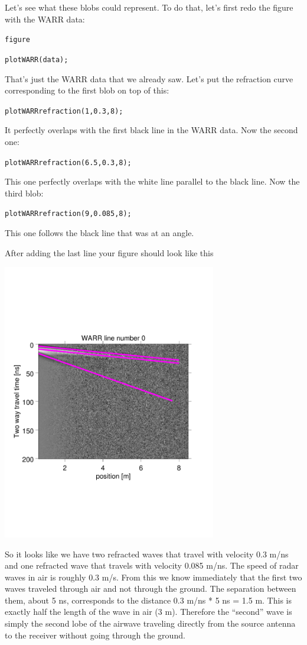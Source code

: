 \documentclass[11pt]{article}
\begin{document}
Let's see what these blobs could represent. To do that, let's first
redo the figure with the WARR data:

\qquad \verb#figure#

\qquad \verb#plotWARR(data);#

That's just the WARR data that we already saw. Let's put the
refraction curve corresponding to the first blob on top of this:
 
\qquad \verb#plotWARRrefraction(1,0.3,8);#

It perfectly overlaps with the first black line in the WARR
data. Now the second one:

\qquad \verb#plotWARRrefraction(6.5,0.3,8);#

This one perfectly overlaps with the white line parallel to the black
line. Now the third blob:

\qquad \verb#plotWARRrefraction(9,0.085,8);#

This one follows the black line that was at an angle.

After adding the last line your figure should look like this
\begin{center}
  \includegraphics[width=0.7\textwidth,trim = 0.9cm 6cm 2cm
    6.5cm,clip]{figures/WARRlines}
\end{center}

So it looks like we have two refracted waves that travel with velocity
0.3 m/ns and one refracted wave that travels with velocity 0.085
m/ns. The speed of radar waves in air is roughly 0.3 m/s. From this we
know immediately that the first two waves traveled through air and not
through the ground. The separation between them, about 5 ns,
corresponds to the distance 0.3 m/ns * 5 ns = 1.5 m. This is exactly
half the length of the wave in air (3 m). Therefore the ``second''
wave is simply the second lobe of the airwave traveling directly from
the source antenna to the receiver without going through the ground.
\end{document}

